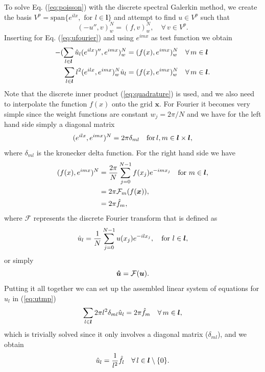\documentclass[%
oneside,                 %
final,                   %
10pt]{article}
\theoremstyle{definition}
\begin{document}
To solve Eq. (\ref{eq:poisson}) with the discrete spectral Galerkin method, we create the basis $V^p = \text{span}\{ e^{ilx} , \text{ for } l \in \boldsymbol{l}\} $ and attempt to find $u \in V^p$ such that
\begin{equation}
(-u'', v)_w^N = (f, v)_w^N, \quad \forall \, v \in V^p.
\end{equation}
Inserting for Eq. (\ref{eq:ufourier}) and using $e^{imx}$ as test function we obtain
\begin{align}
-(\sum_{l \in \boldsymbol{l}} \hat{u}_l (e^{ilx})'', e^{imx})_w^N &= (f(x), e^{imx})_w^N \quad \forall \, m \in \boldsymbol{l} \\ 
\sum_{l \in \boldsymbol{l}} l^2( e^{ilx}, e^{imx})_w^N \hat{u}_l &= (f(x), e^{imx})_w ^N\quad \forall \, m \in \boldsymbol{l}. \label{eq:utmp}
\end{align}
Note that the discrete inner product (\ref{eq:quadrature}) is used, and we also need to interpolate the function $f(x)$ onto the grid $\boldsymbol{x}$. For Fourier it becomes very simple since the weight functions are constant $w_j = 2\pi/N$ and we have for the left hand side simply a diagonal matrix
\begin{equation}
( e^{ilx}, e^{imx})^N = 2\pi \delta_{ml} \quad \text{for} \, l, m \in \boldsymbol{l} \times \boldsymbol{l},
\end{equation}
where $\delta_{ml}$ is the kronecker delta function.
For the right hand side we have
\begin{align}
(f(x), e^{imx})^N &= \frac{2 \pi}{N}\sum_{j=0}^{N-1} f(x_j) e^{-imx_j} \quad \text{for } m \in \boldsymbol{l}, \\ 
 &= 2 \pi \mathcal{F}_m(f(\boldsymbol{x})), \\ 
 &= 2 \pi \hat{f}_m,
\end{align}
where $\mathcal{F}$ represents the discrete Fourier transform that is defined as
\begin{equation}
\hat{u}_l = \frac{1}{N}\sum_{j=0}^{N-1} u(x_j) e^{-ilx_j}, \quad \text{for } l \in \boldsymbol{l},
\end{equation}
or simply
\begin{equation}
  \boldsymbol{\hat{u}} = \mathcal{F}(\boldsymbol{u}).
\end{equation}
Putting it all together we can set up the assembled linear system of equations for $\hat{u}_l$ in (\ref{eq:utmp})
\begin{equation}
\sum_{l \in \boldsymbol{l}}2 \pi l^2 \delta_{ml} \hat{u}_l = 2 \pi \hat{f}_{m} \quad \forall \, m \in \boldsymbol{l},
\end{equation}
which is trivially solved since it only involves a diagonal matrix ($\delta_{ml}$), and we obtain
\begin{equation}
\hat{u}_l = \frac{1}{l^2} \hat{f}_{l} \quad \forall \,l  \in \boldsymbol{l} \setminus{\{0\}}.
\end{equation}
\end{document}
